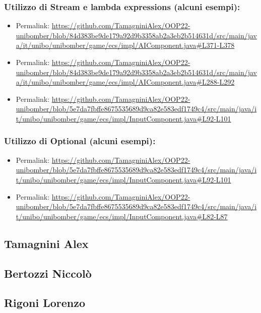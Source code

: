\documentclass[a4paper,12pt]{report}
\begin{document}
\subsubsection*{Utilizzo di Stream e lambda expressions (alcuni esempi):}
\begin{itemize}
    \item Permalink: \url{https://github.com/TamagniniAlex/OOP22-unibomber/blob/84d383be9de179a92d9b3358ab2a3eb2b514631d/src/main/java/it/unibo/unibomber/game/ecs/impl/AIComponent.java#L371-L378}
    \item Permalink: \url{https://github.com/TamagniniAlex/OOP22-unibomber/blob/84d383be9de179a92d9b3358ab2a3eb2b514631d/src/main/java/it/unibo/unibomber/game/ecs/impl/AIComponent.java#L288-L292}
    \item Permalink: \url{https://github.com/TamagniniAlex/OOP22-unibomber/blob/5e7da7fbffe8675535689d9ca82e583edf1749c4/src/main/java/it/unibo/unibomber/game/ecs/impl/InputComponent.java#L92-L101}
\end{itemize}
\subsubsection*{Utilizzo di Optional (alcuni esempi):}
\begin{itemize}
    \item Permalink: \url{https://github.com/TamagniniAlex/OOP22-unibomber/blob/5e7da7fbffe8675535689d9ca82e583edf1749c4/src/main/java/it/unibo/unibomber/game/ecs/impl/InputComponent.java#L92-L101}
    \item Permalink: \url{https://github.com/TamagniniAlex/OOP22-unibomber/blob/5e7da7fbffe8675535689d9ca82e583edf1749c4/src/main/java/it/unibo/unibomber/game/ecs/impl/InputComponent.java#L82-L87}
\end{itemize}

\subsection*{Tamagnini Alex}

\subsection*{Bertozzi Niccolò}

\subsection*{Rigoni Lorenzo}
\end{document}
